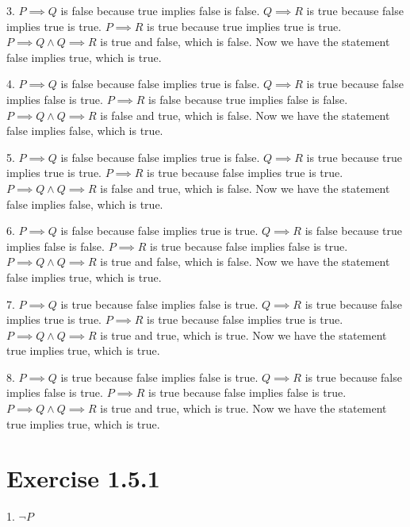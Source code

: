 \documentclass[hidelinks]{article}
\begin{document}
3. \(P \implies Q\) is false because true implies false is false. \(Q \implies R\) is true because false implies true is true. \(P \implies R\) is true because true implies true is true. \(P \implies Q \wedge Q \implies R\) is true and false, which is false. Now we have the statement false implies true, which is true.
\vspace{0.2cm}

4. \(P \implies Q\) is false because false implies true is false. \(Q \implies R\) is true because false implies false is true. \(P \implies R\) is false because true implies false is false. \(P \implies Q \wedge Q \implies R\) is false and true, which is false. Now we have the statement false implies false, which is true.
\vspace{0.2cm}

5. \(P \implies Q\) is false because false implies true is false. \(Q \implies R\) is true because true implies true is true. \(P \implies R\) is true because false implies true is true. \(P \implies Q \wedge Q \implies R\) is false and true, which is false. Now we have the statement false implies false, which is true.
\vspace{0.2cm}

6. \(P \implies Q\) is false because false implies true is true. \(Q \implies R\) is false because true implies false is false. \(P \implies R\) is true because false implies false is true. \(P \implies Q \wedge Q \implies R\) is true and false, which is false. Now we have the statement false implies true, which is true.
\vspace{0.2cm}

7. \(P \implies Q\) is true because false implies false is true. \(Q \implies R\) is true because false implies true is true. \(P \implies R\) is true because false implies true is true. \(P \implies Q \wedge Q \implies R\) is true and true, which is true. Now we have the statement true implies true, which is true.
\vspace{0.2cm}

8. \(P \implies Q\) is true because false implies false is true. \(Q \implies R\) is true because false implies false is true. \(P \implies R\) is true because false implies false is true. \(P \implies Q \wedge Q \implies R\) is true and true, which is true. Now we have the statement true implies true, which is true.

\newpage
\section{Exercise 1.5.1}
1. $\neg P$
\end{document}
